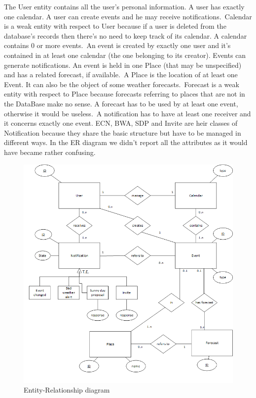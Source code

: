 \documentclass[10pt,a4paper,titlepage]{article}
\begin{document}
The User entity contains all the  user's personal information. A user has exactly one calendar. A user can create events and he may receive notifications.\
Calendar is a weak entity with respect to User because if a user is deleted from the database's records then there's no need  to keep track of its calendar. A calendar contains 0 or more events.\
An event is created by exactly one user and it's contained in at least one calendar (the one belonging to its creator). Events can generate notifications. An event is held in one Place (that may be unspecified) and has a related forecast, if available.\
A Place is the location of at least one Event. It can also be the object of some weather forecasts.\
Forecast is a weak entity with respect to Place because forecasts referring to places that are not in the DataBase make no sense. A forecast has to be used by at least one event, otherwise it would be useless.\
A notification has to have at least one receiver and it concerns exactly one event. ECN, BWA, SDP and Invite are heir classes of Notification because they share the basic structure but have to be managed in different ways.
In the ER diagram we didn't report all the attributes as it would have became rather confusing.
\begin{figure}[p]
\centering
\includegraphics[width=\linewidth]{./images/ER}
\caption[ER]{Entity-Relationship diagram}
\label{fig:ER}
\end{figure}
\end{document}
